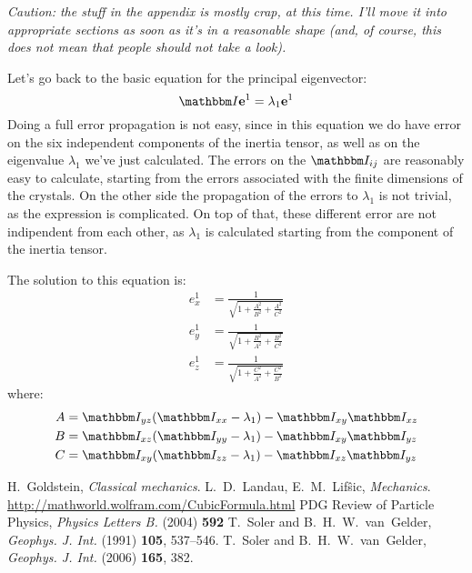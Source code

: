 \documentclass[a4paper,11pt]{article}
\newcommand{\itm}{\mathbbm I}
\newcommand{\itc}[1]{\itm_{#1}}
\begin{document}
\clearpage
\appendix

\emph{Caution: the stuff in the appendix is mostly crap, at this time.
I'll move it into appropriate sections as soon as it's in a reasonable shape
(and, of course, this does not mean that people should not take a look).}



Let's go back to the basic equation for the principal eigenvector:
$$
\itm\mathbf{e}^1 = \lambda_1\mathbf{e}^1
$$
Doing a full error propagation is not easy, since in this equation we do have
error on the six independent components of the inertia tensor, as well as on
the eigenvalue $\lambda_1$ we've just calculated. The errors on the
$\itc{ij}$ are reasonably easy to calculate, starting from the errors
associated with the finite dimensions of the crystals. On the other side
the propagation of the errors to $\lambda_1$ is not trivial, as the
expression is complicated. On top of that, these different error are not
indipendent from each other, as $\lambda_1$ is calculated starting from the
component of the inertia tensor.

The solution to this equation is:
\begin{align}
e^1_x &= \frac{1}{\sqrt{1 + \frac{A^2}{B^2} + \frac{A^2}{C^2}}}\\
e^1_y &= \frac{1}{\sqrt{1 + \frac{B^2}{A^2} + \frac{B^2}{C^2}}}\\
e^1_z &= \frac{1}{\sqrt{1 + \frac{C^2}{A^2} + \frac{C^2}{B^2}}}
\end{align}
where:
\begin{align}
A &= \itc{yz}(\itc{xx} - \lambda_1) - \itc{xy}\itc{xz}\\
B &= \itc{xz}(\itc{yy} - \lambda_1) - \itc{xy}\itc{yz}\\
C &= \itc{xy}(\itc{zz} - \lambda_1) - \itc{xz}\itc{yz}
\end{align}



\begin{thebibliography}{100}
H.~Goldstein, \emph{Classical mechanics}.
L.~D.~Landau, E.~M.~Lif\^sic, \emph{Mechanics}.
\url{http://mathworld.wolfram.com/CubicFormula.html}
PDG Review of Particle Physics,
  \emph{Physics Letters B.} (2004) {\bf 592}
T.~Soler and B.~H.~W.~van~Gelder,
  \emph{Geophys. J. Int.} (1991) {\bf 105}, 537--546.
T.~Soler and B.~H.~W.~van~Gelder,
  \emph{Geophys. J. Int.} (2006) {\bf 165}, 382.
\end{thebibliography}
\end{document}
